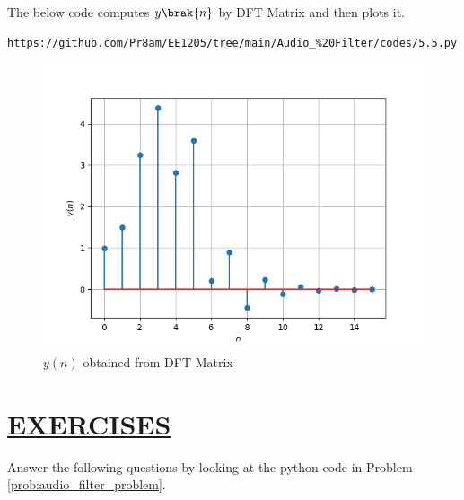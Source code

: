 \documentclass[journal,12pt,twocolumn]{IEEEtran}
\theoremstyle{remark}
\begin{document}
The below code computes $y\brak{n}$ by DFT Matrix and then plots it.
\begin{lstlisting}
https://github.com/Pr8am/EE1205/tree/main/Audio_%20Filter/codes/5.5.py
\end{lstlisting}
\begin{figure}[H]
\centering
\includegraphics[width=\columnwidth]{figs/yn_DFT_matrix.png}
\caption{$y(n)$ obtained from DFT Matrix}
\label{fig:yn_DFT_matrix}
\end{figure}



\section{\underline{EXERCISES}}
\noindent Answer the following questions by looking at the python code in Problem \ref{prob:audio_filter_problem}.
\end{document}
